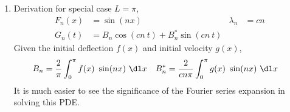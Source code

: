 \begin{enumerate}
    \item Derivation for special case $ L = \pi $,
          \begin{align}
              F_n(x)    & = \sin(nx)                            &
              \lambda_n & = cn                                    \\
              G_n(t)    & = B_n \cos(cn\ t) + B_n^* \sin(cn\ t)
          \end{align}
          Given the initial deflection $ f(x) $ and initial velocity $ g(x) $,
          \begin{align}
              B_n   & = \frac{2}{\pi} \int_{0}^{\pi} f(x)\ \sin(nx)\ \dl x   &
              B_n^* & = \frac{2}{cn\pi} \int_{0}^{\pi} g(x)\ \sin(nx)\ \dl x &
          \end{align}
          It is much easier to see the significance of the Fourier series expansion
          in solving this PDE.


\end{enumerate}
